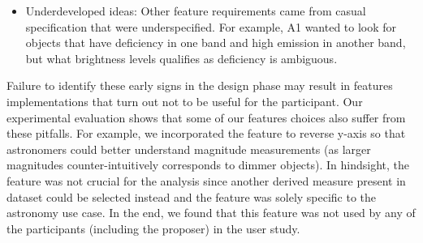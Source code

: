 {\begin{itemize}
\item Underdeveloped ideas: Other feature requirements came from casual specification that were underspecified. For example, A1 wanted to look for objects that have deficiency in one band and high emission in another band, but what brightness levels qualifies as deficiency is ambiguous.
\end{itemize}
\par Failure to identify these early signs in the design phase may result in features implementations that turn out not to be useful for the participant. 
Our experimental evaluation shows that some of our features choices also suffer from these pitfalls. For example, we incorporated the feature to reverse y-axis so that astronomers could better understand magnitude measurements (as larger magnitudes counter-intuitively corresponds to dimmer objects). In hindsight, the feature was not crucial for the analysis since another derived measure present in dataset could be selected instead and the feature was solely specific to the astronomy use case. In the end, we found that this feature was not used by any of the participants (including the proposer) in the user study.%
}